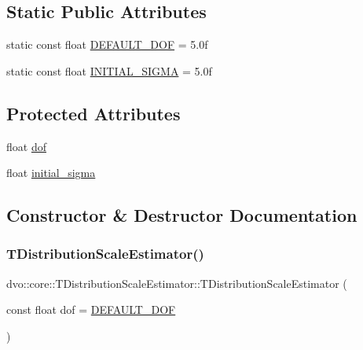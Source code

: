 \subsection*{Static Public Attributes}
\begin{DoxyCompactItemize}
\item 
static const float \mbox{\hyperlink{classdvo_1_1core_1_1_t_distribution_scale_estimator_a031ff291023c516c23bce04b34b79957}{D\+E\+F\+A\+U\+L\+T\+\_\+\+D\+OF}} = 5.\+0f
\item 
static const float \mbox{\hyperlink{classdvo_1_1core_1_1_t_distribution_scale_estimator_a536ae191c3a6827914ecc22308ff87b7}{I\+N\+I\+T\+I\+A\+L\+\_\+\+S\+I\+G\+MA}} = 5.\+0f
\end{DoxyCompactItemize}
\subsection*{Protected Attributes}
\begin{DoxyCompactItemize}
\item 
float \mbox{\hyperlink{classdvo_1_1core_1_1_t_distribution_scale_estimator_a4c5ece510a3315bad7ca711a27466eb9}{dof}}
\item 
float \mbox{\hyperlink{classdvo_1_1core_1_1_t_distribution_scale_estimator_ab2b25d1856c4e51dfeeb1abd9aafbcb7}{initial\+\_\+sigma}}
\end{DoxyCompactItemize}


\subsection{Constructor \& Destructor Documentation}
\mbox{\label{classdvo_1_1core_1_1_t_distribution_scale_estimator_a1b50430701a4f6c103dedf40102e6506}} 
\subsubsection{\texorpdfstring{T\+Distribution\+Scale\+Estimator()}{TDistributionScaleEstimator()}}
{\footnotesize\ttfamily dvo\+::core\+::\+T\+Distribution\+Scale\+Estimator\+::\+T\+Distribution\+Scale\+Estimator (\begin{DoxyParamCaption}\item[{const float}]{dof = {\ttfamily \mbox{\hyperlink{classdvo_1_1core_1_1_t_distribution_scale_estimator_a031ff291023c516c23bce04b34b79957}{D\+E\+F\+A\+U\+L\+T\+\_\+\+D\+OF}}} }\end{DoxyParamCaption})}


